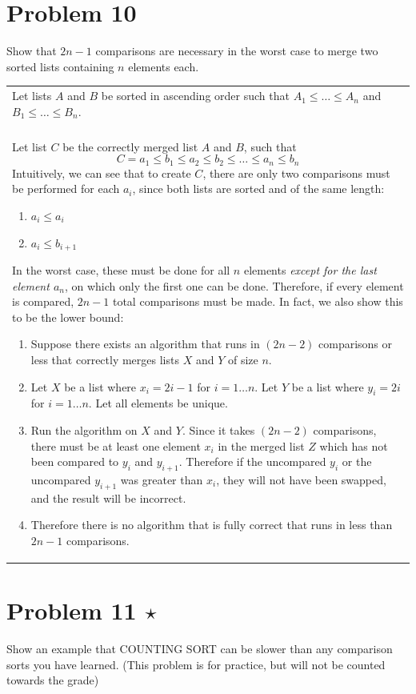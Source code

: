 \documentclass[10pt]{article}
\newenvironment{answer}
    {\begin{center}
    \begin{tabular}{|p{1\textwidth}|}
    \hline
    }
    { 
    \\\hline
    \end{tabular} 
    \end{center}
    }
\begin{document}
\section*{Problem 10}
Show that $2n-1$ comparisons are necessary in the worst case to merge
two sorted lists containing $n$ elements each.

\begin{answer}
  Let lists $A$ and $B$ be sorted in ascending order such that $A_1 \le \ldots \le A_n$ and $B_1 \le \ldots \le B_n$. \\ \\
  Let list $C$ be the correctly merged list $A$ and $B$, such that
  \[C = a_1 \le b_1 \le a_2 \le b_2 \le \ldots \le a_n \le b_n \]
  Intuitively, we can see that to create $C$, there are only two comparisons must be performed for each $a_i$, since both lists are sorted and of the same length:
  \begin{enumerate}
  \item $a_i \le a_{i}$
  \item $a_i \le b_{i+1}$
  \end{enumerate}
  In the worst case, these must be done for all $n$ elements \emph{except for the last element $a_n$}, on which only the first one can be done. Therefore, if every element is compared, $2n-1$ total comparisons must be made. In fact, we also show this to be the lower bound: 
  \begin{enumerate}
  \item Suppose there exists an algorithm that runs in $(2n-2)$
    comparisons or less that correctly merges lists $X$ and $Y$ of size $n$.
  \item Let $X$ be a list where $x_i=2i-1$ for $i = 1 \ldots n$. Let $Y$ be a list where $y_i=2i$ for $i = 1 \ldots n$. Let all elements be unique.
  \item Run the algorithm on $X$ and $Y$. Since it takes $(2n-2)$ comparisons, there must be at least one element $x_i$ in the merged list $Z$ which has not been compared to $y_i$ and $y_{i+1}$. Therefore if the uncompared $y_i$ or the uncompared $y_{i+1}$ was greater than $x_i$, they will not have been swapped, and the result will be incorrect.
  \item Therefore there is no algorithm that is fully correct that runs in less than $2n-1$ comparisons.
  \end{enumerate}
\end{answer}

%

\section*{Problem 11 $\star$}
Show an example that COUNTING SORT can be slower than any comparison sorts you have learned. (This problem is for practice,  but will not be counted towards the grade)
\end{document}
